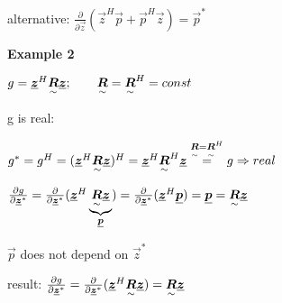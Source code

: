 alternative: $ \frac{\partial}{\partial \vec{z}}(\vec{z}^H\vec{p}+\vec{p}^H\vec{z}) = \vec{p}^* $

\textbf{Example 2}

$g=\vec{z}^H\ma{R}\vec{z}; \qquad \ma{R}=\ma{R}^H=const$

g is real:

$g^*=g^H=(\vec{z}^H\ma{R}\vec{z})^H=\vec{z}^H\ma{R}^H\vec{z} 
\overset{\ma{R}=\ma{R}^H}{=} 
g\Rightarrow real $

$\frac{\partial g}{\partial \vec{z}^*}
=\frac{\partial}{\partial \vec{z}^*}(\vec{z}^H\underbrace{\ma{R}\vec{z}}_{\vec{p}})
=\frac{\partial}{\partial \vec{z}^*}(\vec{z}^H\vec{p})
=\vec{p}
=\ma{R}\vec{z}$

$\vec{p}$ does not depend on $\vec{z}^*$

result: $\frac{\partial g}{\partial \vec{z}^*}=\frac{\partial}{\partial \vec{z}^*}(\vec{z}^H\ma{R}\vec{z})=\ma{R}\vec{z}$

